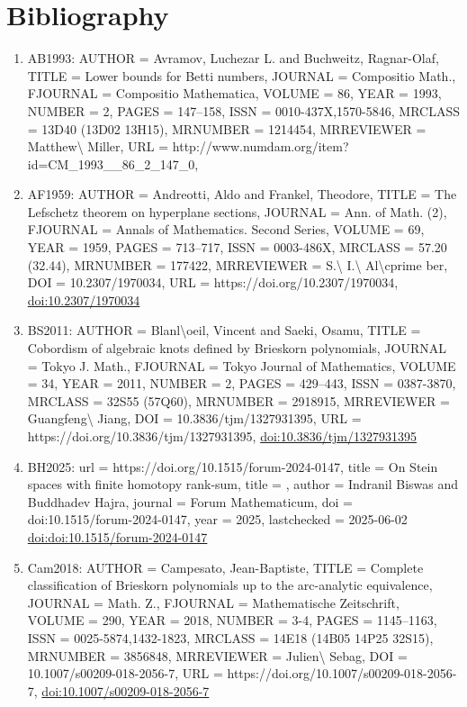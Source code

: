 \documentclass[11pt]{article}
\begin{document}
\section*{Bibliography}
\begin{enumerate}[leftmargin=*]
  \item AB1993: AUTHOR = Avramov, Luchezar L. and Buchweitz, Ragnar-Olaf, TITLE = Lower bounds for Betti numbers, JOURNAL = Compositio Math., FJOURNAL = Compositio Mathematica, VOLUME = 86, YEAR = 1993, NUMBER = 2, PAGES = 147--158, ISSN = 0010-437X,1570-5846, MRCLASS = 13D40 (13D02 13H15), MRNUMBER = 1214454, MRREVIEWER = Matthew\textbackslash{} Miller, URL = http://www.numdam.org/item?id=CM\_1993\_\_86\_2\_147\_0,
  \item AF1959: AUTHOR = Andreotti, Aldo and Frankel, Theodore, TITLE = The Lefschetz theorem on hyperplane sections, JOURNAL = Ann. of Math. (2), FJOURNAL = Annals of Mathematics. Second Series, VOLUME = 69, YEAR = 1959, PAGES = 713--717, ISSN = 0003-486X, MRCLASS = 57.20 (32.44), MRNUMBER = 177422, MRREVIEWER = S.\textbackslash{} I.\textbackslash{} Al\textbackslash{}cprime ber, DOI = 10.2307/1970034, URL = https://doi.org/10.2307/1970034, \href{https://doi.org/10.2307/1970034}{doi:10.2307/1970034}
  \item BS2011: AUTHOR = Blanl\textbackslash{}oeil, Vincent and Saeki, Osamu, TITLE = Cobordism of algebraic knots defined by Brieskorn polynomials, JOURNAL = Tokyo J. Math., FJOURNAL = Tokyo Journal of Mathematics, VOLUME = 34, YEAR = 2011, NUMBER = 2, PAGES = 429--443, ISSN = 0387-3870, MRCLASS = 32S55 (57Q60), MRNUMBER = 2918915, MRREVIEWER = Guangfeng\textbackslash{} Jiang, DOI = 10.3836/tjm/1327931395, URL = https://doi.org/10.3836/tjm/1327931395, \href{https://doi.org/10.3836/tjm/1327931395}{doi:10.3836/tjm/1327931395}
  \item BH2025: url = https://doi.org/10.1515/forum-2024-0147, title = On Stein spaces with finite homotopy rank-sum, title = , author = Indranil Biswas and Buddhadev Hajra, journal = Forum Mathematicum, doi = doi:10.1515/forum-2024-0147, year = 2025, lastchecked = 2025-06-02 \href{https://doi.org/doi:10.1515/forum-2024-0147}{doi:doi:10.1515/forum-2024-0147}
  \item Cam2018: AUTHOR = Campesato, Jean-Baptiste, TITLE = Complete classification of Brieskorn polynomials up to the arc-analytic equivalence, JOURNAL = Math. Z., FJOURNAL = Mathematische Zeitschrift, VOLUME = 290, YEAR = 2018, NUMBER = 3-4, PAGES = 1145--1163, ISSN = 0025-5874,1432-1823, MRCLASS = 14E18 (14B05 14P25 32S15), MRNUMBER = 3856848, MRREVIEWER = Julien\textbackslash{} Sebag, DOI = 10.1007/s00209-018-2056-7, URL = https://doi.org/10.1007/s00209-018-2056-7, \href{https://doi.org/10.1007/s00209-018-2056-7}{doi:10.1007/s00209-018-2056-7}

\end{enumerate}
\end{document}
